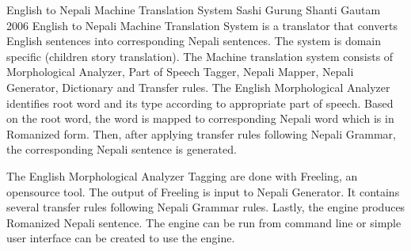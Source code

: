  \begin{conf-abstract}[]
{English to Nepali Machine Translation System}
{
Sashi Gurung
Shanti Gautam
}
{2006}
English to Nepali Machine Translation System is a translator that converts English sentences into corresponding Nepali sentences. The system is domain specific (children story translation). The Machine translation system consists of Morphological Analyzer, Part of Speech Tagger, Nepali Mapper, Nepali Generator, Dictionary and Transfer rules. The English Morphological Analyzer identifies root word and its type according to appropriate part of speech. Based on the root word, the word is mapped to corresponding Nepali word which is in Romanized form. Then, after applying transfer rules following Nepali Grammar, the corresponding Nepali sentence is generated.

The English Morphological Analyzer Tagging are done with Freeling, an opensource tool. The output of Freeling is input to Nepali Generator. It contains several transfer rules following Nepali Grammar rules. Lastly, the engine produces Romanized Nepali sentence. The engine can be run from command line or simple user interface can be created to use the engine.
  \end{conf-abstract}